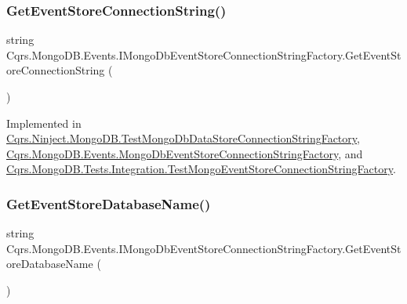 \subsubsection{\texorpdfstring{Get\+Event\+Store\+Connection\+String()}{GetEventStoreConnectionString()}}
{\footnotesize\ttfamily string Cqrs.\+Mongo\+D\+B.\+Events.\+I\+Mongo\+Db\+Event\+Store\+Connection\+String\+Factory.\+Get\+Event\+Store\+Connection\+String (\begin{DoxyParamCaption}{ }\end{DoxyParamCaption})}



Implemented in \hyperlink{classCqrs_1_1Ninject_1_1MongoDB_1_1TestMongoDbDataStoreConnectionStringFactory_a3dcdc2262f3a39be8fdba16a6d09c523_a3dcdc2262f3a39be8fdba16a6d09c523}{Cqrs.\+Ninject.\+Mongo\+D\+B.\+Test\+Mongo\+Db\+Data\+Store\+Connection\+String\+Factory}, \hyperlink{classCqrs_1_1MongoDB_1_1Events_1_1MongoDbEventStoreConnectionStringFactory_af78f60c035678185ecd266019f42838b_af78f60c035678185ecd266019f42838b}{Cqrs.\+Mongo\+D\+B.\+Events.\+Mongo\+Db\+Event\+Store\+Connection\+String\+Factory}, and \hyperlink{classCqrs_1_1MongoDB_1_1Tests_1_1Integration_1_1TestMongoEventStoreConnectionStringFactory_a73b68d1160bae4e92bed4445303d6a8f_a73b68d1160bae4e92bed4445303d6a8f}{Cqrs.\+Mongo\+D\+B.\+Tests.\+Integration.\+Test\+Mongo\+Event\+Store\+Connection\+String\+Factory}.

\mbox{\label{interfaceCqrs_1_1MongoDB_1_1Events_1_1IMongoDbEventStoreConnectionStringFactory_a81ee28bfbb0e567b95f2b280bc6fb298_a81ee28bfbb0e567b95f2b280bc6fb298}} 
\subsubsection{\texorpdfstring{Get\+Event\+Store\+Database\+Name()}{GetEventStoreDatabaseName()}}
{\footnotesize\ttfamily string Cqrs.\+Mongo\+D\+B.\+Events.\+I\+Mongo\+Db\+Event\+Store\+Connection\+String\+Factory.\+Get\+Event\+Store\+Database\+Name (\begin{DoxyParamCaption}{ }\end{DoxyParamCaption})}



